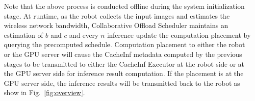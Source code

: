 Note that the above process is conducted offline during the system initialization stage.
At runtime, as the robot collects the input images and estimates the wireless network bandwidth, Collaborative Offload Scheduler maintains an estimation of $b$ and $c$ and every $n$ inference update the computation placement by querying the precomputed schedule.
Computation placement to either the robot or the GPU server will cause the CacheInf metadata computed by the previous stages to be transmitted to either the CacheInf Executor at the robot side or at the GPU server side for inference result computation.
If the placement is at the GPU server side, the inference results will be transmitted back to the robot as show in Fig.~\ref{fig:overview}.




